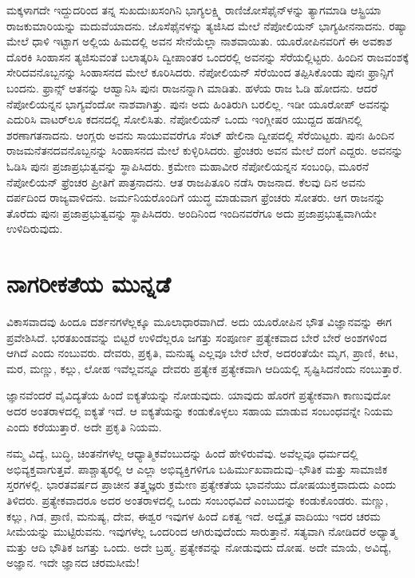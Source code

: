 ಮಕ್ಕಳಾಗದೇ ಇದ್ದುದರಿಂದ ತನ್ನ ಸುಖದುಃಖಸಂಗಿನಿ ಭಾಗ್ಯಲಕ್ಷ್ಮಿ ರಾಣಿ\break ಜೋಸೆಫೈನ್​ಳನ್ನು ತ್ಯಾಗಮಾಡಿ ಆಸ್ಟ್ರಿಯಾ ರಾಜಕುಮಾರಿಯನ್ನು ಮದುವೆಯಾದನು. ಜೊಸೆಫೈನಳನ್ನು ತ್ಯಜಿಸಿದ ಮೇಲೆ ನೆಪೋಲಿಯನ್​ ಭಾಗ್ಯಹೀನನಾದನು. ರಷ್ಯಾ ಮೇಲೆ ಧಾಳಿ ಇಟ್ಟಾಗ ಅಲ್ಲಿಯ ಹಿಮದಲ್ಲಿ ಅವನ ಸೇನೆಯೆಲ್ಲಾ ನಾಶವಾಯಿತು. ಯೂರೋಪಿ\break ನವರಿಗೆ ಈ ಅವಕಾಶ ದೊರಕಿ ಸಿಂಹಾಸನ ತ್ಯಜಿಸುವಂತೆ ಬಲಾತ್ಕರಿಸಿ ದ್ವೀಪಾಂತರ ಒಂದರಲ್ಲಿ ಅವನನ್ನು ಸೆರೆಯಲ್ಲಿಟ್ಟರು. ಹಿಂದಿನ ರಾಜವಂಶಕ್ಕೆ ಸೇರಿದವನೊಬ್ಬನನ್ನು ಸಿಂಹಾಸನದ ಮೇಲೆ ಕೂರಿಸಿದರು. ನೆಪೋಲಿಯನ್​ ಸೆರೆಯಿಂದ ತಪ್ಪಿಸಿಕೊಂಡು ಪುನಃ ಫ್ರಾನ್ಸಿಗೆ ಬಂದನು. ಫ್ರಾನ್ಸ್​ ಆತನನ್ನು ಆಹ್ವಾನಿಸಿ ಪುನಃ ರಾಜನನ್ನಾಗಿ ಮಾಡಿತು. ಹಳೆಯ ರಾಜ ಓಡಿ ಹೋದನು. ಆದರೆ ನೆಪೋಲಿಯನ್ನನ ಭಾಗ್ಯವೆಂದೋ ನಾಶವಾಗಿತ್ತು. ಪುನಃ ಅದು ಹಿಂತಿರುಗಿ ಬರಲಿಲ್ಲ. ಇಡೀ ಯೂರೋಪ್​ ಅವನನ್ನು ಎದುರಿಸಿ ವಾಟರ್​ಲೂ ಕದನದಲ್ಲಿ ಸೋಲಿಸಿತು. ನೆಪೋಲಿಯನ್​ ಒಂದು ಇಂಗ್ಲೀಷರ ಯುದ್ದದ ಹಡಗಿನಲ್ಲಿ ಶರಣಾಗತನಾದನು. ಆಂಗ್ಲರು ಅವನು ಸಾಯುವವರೆಗೂ ಸೆಂಟ್​ ಹೇಲಿನಾ ದ್ವೀಪದಲ್ಲಿ ಸೆರೆಯಿಟ್ಟರು. ಪುನಃ ಹಿಂದಿನ ರಾಜಮನೆತನದವನೊಬ್ಬನನ್ನು ಸಿಂಹಾಸನದ ಮೇಲೆ ಕುಳ್ಳಿರಿಸಿ\break ದರು. ಫ್ರೆಂಚರು ಅವನ ಮೇಲೆ ದಂಗೆ ಎದ್ದರು. ಅವನನ್ನು ಓಡಿಸಿ ಪುನಃ ಪ್ರಜಾಪ್ರಭುತ್ವವನ್ನು ಸ್ಥಾಪಿಸಿದರು. ಕ್ರಮೇಣ ಮಹಾವೀರ ನೆಪೋಲಿಯನ್ನನ ಸಂಬಂಧಿ, ಮೂರನೆ ನೆಪೋಲಿಯನ್​ ಫ್ರೆಂಚರ ಪ್ರೀತಿಗೆ ಪಾತ್ರನಾದನು. ಆತ ರಾಜಪಿತೂರಿ ನಡೆಸಿ ರಾಜನಾದ. ಕೆಲವು ದಿನ ಅವನು ದರ್ಪದಿಂದ ರಾಜ್ಯವಾಳಿದನು. ಜರ್ಮನಿಯರೊಂದಿಗೆ ಯುದ್ಧ ಮಾಡುವಾಗ ಫ್ರೆಂಚರು ಸೋತರು. ಆಗ ರಾಜನನ್ನು ತೊರೆದು ಪುನಃ ಪ್ರಜಾಪ್ರಭುತ್ವವನ್ನು ಸ್ಥಾಪಿಸಿದರು. ಅಂದಿನಿಂದ ಇಂದಿನವರೆಗೂ ಅದು ಪ್ರಜಾಪ್ರಭುತ್ವವಾಗಿಯೇ ಉಳಿದಿರುವುದು.

\newpage

\section*{ನಾಗರೀಕತೆಯ ಮುನ್ನಡೆ}

ವಿಕಾಸವಾದವು ಹಿಂದೂ ದರ್ಶನಗಳೆಲ್ಲಕ್ಕೂ ಮೂಲಾಧಾರವಾಗಿದೆ. ಅದು ಯೂರೋಪಿನ ಭೌತ ವಿಜ್ಞಾನವನ್ನು ಈಗ ಪ್ರವೇಶಿಸಿದೆ. ಭರತಖಂಡವನ್ನು ಬಿಟ್ಟರೆ ಉಳಿದೆಲ್ಲರೂ ಜಗತ್ತು ಸಂಪೂರ್ಣ ಪ್ರತ್ಯೇಕವಾದ ಬೇರೆ ಬೇರೆ ಅಂಶಗಳಿಂದ ಆಗಿದೆ ಎಂದು ನಂಬುವರು. ದೇವರು, ಪ್ರಕೃತಿ, ಮನುಷ್ಯ ಎಲ್ಲವೂ ಬೇರೆ ಬೇರೆ, ಅದರಂತೆಯೇ ಮೃಗ, ಪ್ರಾಣಿ, ಕೀಟ, ಮರ, ಮಣ್ಣು, ಕಲ್ಲು, ಲೋಹ ಇವೆಲ್ಲವನ್ನೂ ದೇವರು ಪ್ರತ್ಯೇಕ ಪ್ರತ್ಯೇಕವಾಗಿ ಆದಿಯಲ್ಲಿ ಸೃಷ್ಟಿಸಿದನೆಂದು ನಂಬುತ್ತಾರೆ.

ಜ್ಞಾನವೆಂದರೆ ವೈವಿದ್ಯತೆಯ ಹಿಂದೆ ಐಕ್ಯತೆಯನ್ನು ನೋಡುವುದು. ಯಾವುದು ಹೊರಗೆ ಪ್ರತ್ಯೇಕವಾಗಿ ಕಾಣುವುದೋ ಅದರ ಅಂತರಾಳದಲ್ಲಿ ಐಕ್ಯತೆ ಇದೆ. ಆ ಐಕ್ಯತೆಯನ್ನು ಕಂಡುಕೊಳ್ಳಲು ಸಹಾಯ ಮಾಡುವ ಸಂಬಂಧವನ್ನೇ ನಿಯಮ ಎಂದು ಕರೆಯುತ್ತಾರೆ. ಅದೇ ಪ್ರಕೃತಿ ನಿಯಮ.

ನಮ್ಮ ವಿದ್ಯೆ, ಬುದ್ಧಿ, ಚಿಂತನೆಗಳೆಲ್ಲ ಆಧ್ಯಾತ್ಮಿಕವೆಂಬುದನ್ನು ಹಿಂದೆ ಹೇಳಿರುವೆವು. ಅವೆಲ್ಲವೂ ಧರ್ಮದಲ್ಲಿ ಅಭಿವ್ಯಕ್ತವಾಗುತ್ತವೆ. ಪಾಶ್ಚಾತ್ಯರಲ್ಲಿ ಆ ಎಲ್ಲಾ ಅಭಿವ್ಯಕ್ತಿಗಳಿಗೂ ಬಹಿರ್ಮುಖವಾದುವು–ಭೌತಿಕ ಮತ್ತು ಸಾಮಾಜಿಕ ಸ್ತರಗಳಲ್ಲಿ. ಭಾರತವರ್ಷದ ಪ್ರಾಚೀನ ತತ್ತ್ವಜ್ಞರು ಕ್ರಮೇಣ ಪ್ರತ್ಯೇಕತೆಯ ಭಾವನೆಯು ದೋಷಯುಕ್ತವಾದುದು ಎಂದು ತಿಳಿದರು. ಪ್ರತ್ಯೇಕವಾದರೂ ಅದರ ಅಂತರಾಳದಲ್ಲಿ ಒಂದು ಸಂಬಂಧವಿದೆ ಎಂಬುದನ್ನು ಕಂಡುಕೊಂಡರು. ಮಣ್ಣು, ಕಲ್ಲು, ಗಿಡ, ಪ್ರಾಣಿ, ಮನುಷ್ಯ, ದೇವ, ಈಶ್ವರ ಇವುಗಳ ಹಿಂದೆ ಏಕತ್ವ ಇದೆ. ಅದ್ವೈತ ವಾದಿಯು ಇದರ ಚರಮ ಸೀಮೆಯನ್ನು ಮುಟ್ಟಿರುವನು. ಇವುಗಳೆಲ್ಲ ಒಂದರಿಂದ ಆಗಿರುವುದೆಂದು ಸಾರುತ್ತಾನೆ. ಸತ್ಯವಾಗಿ ನೋಡಿದರೆ ಅಧ್ಯಾತ್ಮ ಮತ್ತು ಆದಿ ಭೌತಿಕ ಜಗತ್ತು ಒಂದು. ಅದೇ ಬ್ರಹ್ಮ. ಪ್ರತ್ಯೇಕವನ್ನು ನೋಡುವುದು ದೋಷ. ಅದೇ ಮಾಯೆ, ಅವಿದ್ಯೆ, ಅಜ್ಞಾನ. ಇದೇ ಜ್ಞಾನದ ಚರಮಸೀಮೆ!

